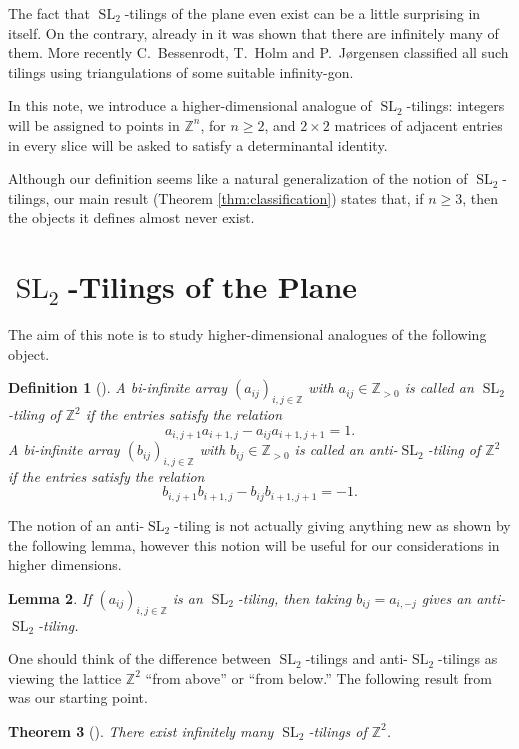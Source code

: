 \documentclass[12pt]{amsart}
\newtheorem{theorem}{Theorem}
\newtheorem{definition}[theorem]{Definition}
\newtheorem{lemma}[theorem]{Lemma}
\newcommand{\SL}{\operatorname{SL}}
\newcommand{\ZZ}{\mathbb{Z}}
\begin{document}
  The fact that $\SL_2$-tilings of the plane even exist can be a little surprising in itself.
  On the contrary, already in \cite{AssemReutenauerSmith} it was shown that there are infinitely many of them.
  More recently C.~Bessenrodt, T.~Holm and P.~J{\o}rgensen \cite{BessenrodtHolmJorgensen} classified all such tilings using triangulations of some suitable infinity-gon.

  In this note, we introduce a higher-dimensional analogue of $\SL_2$-tilings: integers will be assigned to points in $\mathbb{Z}^n$, for $n\geq 2$, and $2\times 2$ matrices of adjacent entries in every slice will be asked to satisfy a determinantal identity.

  Although our definition seems like a natural generalization of the notion of $\SL_2$-tilings, our main result (Theorem \ref{thm:classification}) states that, if $n\geq 3$, then the objects it defines almost never exist.

\section{$\SL_2$-Tilings of the Plane}
  The aim of this note is to study higher-dimensional analogues of the following object.
  \begin{definition}[\cite{AssemReutenauerSmith}]\label{defi::sl2plane}
    A bi-infinite array $(a_{ij})_{i,j\in\ZZ}$ with $a_{ij}\in\ZZ_{>0}$ is called an \emph{$\SL_2$-tiling of $\ZZ^2$} if the entries satisfy the relation
    \begin{equation}\label{eq:sl2 recursion}
      a_{i,j+1}a_{i+1,j}-a_{ij}a_{i+1,j+1}=1.
    \end{equation}
    A bi-infinite array $(b_{ij})_{i,j\in\ZZ}$ with $b_{ij}\in\ZZ_{>0}$  is called an \emph{anti-$\SL_2$-tiling of $\ZZ^2$} if the entries satisfy the relation
    \begin{equation}\label{eq:anti-sl2 recursion}
      b_{i,j+1}b_{i+1,j}-b_{ij}b_{i+1,j+1}=-1.
    \end{equation}
  \end{definition}
  The notion of an anti-$\SL_2$-tiling is not actually giving anything new as shown by the following lemma, however this notion will be useful for our considerations in higher dimensions.
  \begin{lemma}
    \label{lem:n=2 equivalent}
    If $(a_{ij})_{i,j\in\ZZ}$ is an $\SL_2$-tiling, then taking $b_{ij}=a_{i,-j}$ gives an anti-$\SL_2$-tiling.
  \end{lemma}
  One should think of the difference between $\SL_2$-tilings and anti-$\SL_2$-tilings as viewing the lattice $\ZZ^2$ ``from above'' or ``from below.''
  The following result from \cite{AssemReutenauerSmith} was our starting point.
  \begin{theorem}[\cite{AssemReutenauerSmith}]
    There exist infinitely many $\SL_2$-tilings of $\ZZ^2$.
  \end{theorem}
\end{document}
